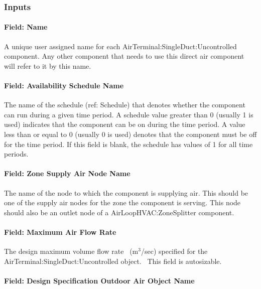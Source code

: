 \subsubsection{Inputs}\label{inputs-001}

\paragraph{Field: Name}\label{field-name-001}

A unique user assigned name for each AirTerminal:SingleDuct:Uncontrolled component. Any other component that needs to use this direct air component will refer to it by this name.

\paragraph{Field: Availability Schedule Name}\label{field-availability-schedule-name}

The name of the schedule (ref: Schedule) that denotes whether the component can run during a given time period. A schedule value greater than 0 (usually 1 is used) indicates that the component can be on during the time period. A value less than or equal to 0 (usually 0 is used) denotes that the component must be off for the time period. If this field is blank, the schedule has values of 1 for all time periods.

\paragraph{Field: Zone Supply Air Node Name}\label{field-zone-supply-air-node-name}

The name of the node to which the component is supplying air. This should be one of the supply air nodes for the zone the component is serving. This node should also be an outlet node of a AirLoopHVAC:ZoneSplitter component.

\paragraph{Field: Maximum Air Flow Rate}\label{field-maximum-air-flow-rate}

The design maximum volume flow rate~ (m\(^{3}\)/sec) specified for the AirTerminal:SingleDuct:Uncontrolled object.~ This field is autosizable.

\paragraph{Field: Design Specification Outdoor Air Object Name}\label{field-DSOA-object-name}

